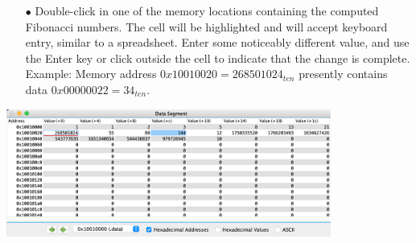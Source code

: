 \documentclass[12pt]{article}
\begin{document}
\begin{enumerate}
    \begin{itemize}
        \item[$\bullet$] Double-click in one of the memory locations containing the computed Fibonacci numbers. The cell will be highlighted and will accept keyboard entry, similar to a spreadsheet. Enter some noticeably different value, and use the Enter key or click outside the cell to indicate that the change is complete. Example: Memory address $0x10010020 = 268501024_{ten}$ presently contains data $0x00000022 = 34_{ten}$.
    \end{itemize}
            \begin{center}
            \includegraphics[width=0.8\textwidth]{30.png}
         \end{center}


\end{enumerate}
\end{document}
